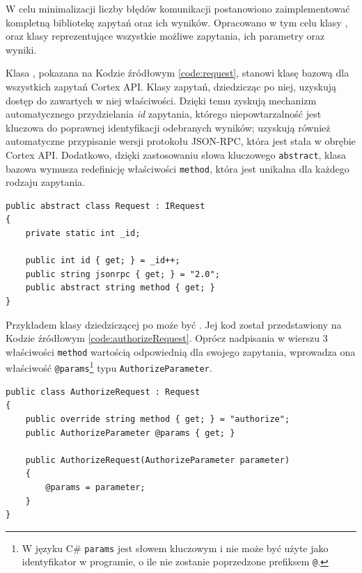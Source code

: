 \documentclass[skorowidz,skroty]{dyplomWEZUT}
\begin{document}
W celu minimalizacji liczby błędów komunikacji postanowiono zaimplementować kompletną bibliotekę zapytań oraz ich wyników. Opracowano w tym celu klasy ,  oraz klasy reprezentujące wszystkie możliwe zapytania, ich parametry oraz wyniki. 

Klasa , pokazana na Kodzie źródłowym \vref{code:request}, stanowi klasę bazową dla wszy\-stkich zapytań Cortex API. Klasy zapytań, dziedzicząc po niej, uzyskują dostęp do zawartych w niej właściwości. Dzięki temu zyskują mechanizm automatycznego przydzielania \textit{id} zapytania, którego niepowtarzalność jest kluczowa do poprawnej identyfikacji odebranych wyników; uzyskują również automatyczne przypisanie wersji protokołu JSON-RPC, która jest stała w obrębie Cortex API. Dodatkowo, dzięki zastosowaniu słowa kluczowego \lstinline[language=C]{abstract}, klasa bazowa wymusza redefinicję właściwości \lstinline[language={[Sharp]C}]{method}, która jest unikalna dla każdego rodzaju zapytania.

\vfill

\begin{lstlisting}[language={[Sharp]C}]
public abstract class Request : IRequest
{
    private static int _id;

    public int id { get; } = _id++;
    public string jsonrpc { get; } = "2.0";
    public abstract string method { get; }
}
\end{lstlisting}

\vfill

Przykładem klasy dziedziczącej po  może być . Jej kod został przedstawiony na Kodzie źródłowym \vref{code:authorizeRequest}. Oprócz nadpisania w wierszu 3 właściwości \lstinline[language={[Sharp]C}]{method} wartością odpowiednią dla swojego zapytania, wprowadza ona właściwość \lstinline[language={C}]{@params}\footnote{W języku C\# \lstinline[language={C}]{params} jest słowem kluczowym i nie może być użyte jako identyfikator w programie, o ile nie zostanie poprzedzone prefiksem \lstinline[language={[Sharp]C}]{@}.} typu \lstinline[language={[Sharp]C}]{AuthorizeParameter}. 

\vfill

\begin{lstlisting}[language={[Sharp]C}]
public class AuthorizeRequest : Request
{
    public override string method { get; } = "authorize";
    public AuthorizeParameter @params { get; }

    public AuthorizeRequest(AuthorizeParameter parameter)
    {
        @params = parameter;
    }
}
\end{lstlisting}
\end{document}
